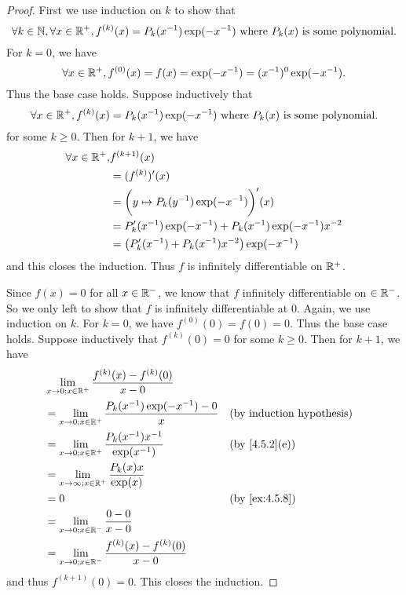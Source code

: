 \begin{proof}
  First we use induction on \(k\) to show that
  \[
    \forall k \in \mathbb{N}, \forall x \in \mathbb{R}^+, f^{(k)}(x) = P_k(x^{-1}) \exp(-x^{-1}) \text{ where } P_k(x) \text{ is some polynomial}.
  \]
  For \(k = 0\), we have
  \[
    \forall x \in \mathbb{R}^+, f^{(0)}(x) = f(x) = \exp(-x^{-1}) = (x^{-1})^0 \exp(-x^{-1}).
  \]
  Thus the base case holds.
  Suppose inductively that
  \[
    \forall x \in \mathbb{R}^+, f^{(k)}(x) = P_k(x^{-1}) \exp(-x^{-1}) \text{ where } P_k(x) \text{ is some polynomial}.
  \]
  for some \(k \geq 0\).
  Then for \(k + 1\), we have
  \begin{align*}
    \forall x \in \mathbb{R}^+, & f^{(k + 1)}(x)                                                  \\
                        & = (f^{(k)})'(x)                                                 \\
                        & = \bigg(y \mapsto P_k(y^{-1}) \exp(-x^{-1})\bigg)'(x)           \\
                        & = P_k'(x^{-1}) \exp(-x^{-1}) + P_k(x^{-1}) \exp(-x^{-1}) x^{-2} \\
                        & = \big(P_k'(x^{-1}) + P_k(x^{-1}) x^{-2}\big) \exp(-x^{-1})
  \end{align*}
  and this closes the induction.
  Thus \(f\) is infinitely differentiable on \(\mathbb{R}^+\).

  Since \(f(x) = 0\) for all \(x \in \mathbb{R}^-\), we know that \(f\) infinitely differentiable on \(\in \mathbb{R}^-\).
  So we only left to show that \(f\) is infinitely differentiable at \(0\).
  Again, we use induction on \(k\).
  For \(k = 0\), we have \(f^{(0)}(0) = f(0) = 0\).
  Thus the base case holds.
  Suppose inductively that \(f^{(k)}(0) = 0\) for some \(k \geq 0\).
  Then for \(k + 1\), we have
  \begin{align*}
     & \lim_{x \to 0 ; x \in \R^+} \dfrac{f^{(k)}(x) - f^{(k)}(0)}{x - 0}                                      \\
     & = \lim_{x \to 0 ; x \in \R^+} \dfrac{P_k(x^{-1}) \exp(-x^{-1}) - 0}{x} &  & \byIH                       \\
     & = \lim_{x \to 0 ; x \in \R^+} \dfrac{P_k(x^{-1}) x^{-1}}{\exp(x^{-1})} &  & \text{(by \cref{4.5.2}(e))} \\
     & = \lim_{x \to \infty ; x \in \R^+} \dfrac{P_k(x) x}{\exp(x)}                                            \\
     & = 0                                                                    &  & \by{ex:4.5.8}               \\
     & = \lim_{x \to 0 ; x \in \R^-} \dfrac{0 - 0}{x - 0}                                                      \\
     & = \lim_{x \to 0 ; x \in \R^-} \dfrac{f^{(k)}(x) - f^{(k)}(0)}{x - 0}
  \end{align*}
  and thus \(f^{(k + 1)}(0) = 0\).
  This closes the induction.


\end{proof}
